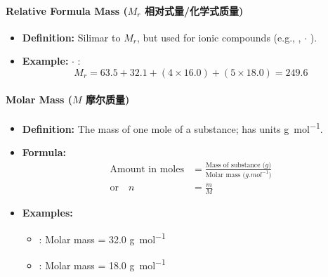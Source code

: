 \paragraph{Relative Formula Mass ($M_r$ 相对式量/化学式质量)}
\begin{itemize}
    \item \textbf{Definition:} Silimar to $M_r$, but used for ionic compounds (e.g., ,  $\cdot$ ).
    \item \textbf{Example:}  $\cdot$ :
    \begin{equation}
        M_r = 63.5 + 32.1 + (4 \times 16.0) + (5 \times 18.0) = 249.6
    \end{equation}
\end{itemize}

\paragraph{Molar Mass ($M$ 摩尔质量)}
\begin{itemize}
    \item \textbf{Definition:} The mass of one mole of a substance; has units \unit{g.mol^{-1}}.
    \item \textbf{Formula:}
    \begin{equation}
        \begin{split}
            \text{Amount in moles} &= \frac{\text{Mass of substance (} \unit{g} \text{)}}{\text{Molar mass (} \unit{g.mol^{-1}}
            \text{)}}\\
            \text{or} \quad n &= \frac{m}{M}
        \end{split}
    \end{equation}
    \item \textbf{Examples:}
    \begin{itemize}
        \item {}: Molar mass = 32.0 \unit{g.mol^{-1}}
        \item {}: Molar mass = 18.0 \unit{g.mol^{-1}}
    \end{itemize}
\end{itemize}

